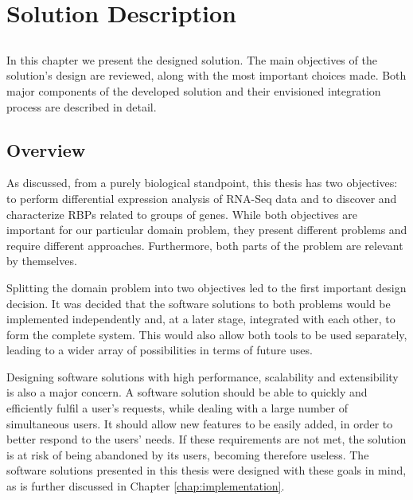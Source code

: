 \chapter{Solution Description} \label{chap:description}

\section*{}

In this chapter we present the designed solution. The main objectives of the
solution's design are reviewed, along with the most important choices made. Both
major components of the developed solution and their envisioned integration
process are described in detail.

\section{Overview}


As discussed, from a purely biological standpoint, this thesis has two
objectives: to perform differential expression analysis of RNA-Seq data and to
discover and characterize RBPs related to groups of genes. While both objectives
are important for our particular domain problem, they present different problems
and require different approaches. Furthermore, both parts of the problem are
relevant by themselves.

Splitting the domain problem into two objectives led to the first important
design decision. It was decided that the software solutions to both problems
would be implemented independently and, at a later stage, integrated with each
other, to form the complete system. This would also allow both tools to be used
separately, leading to a wider array of possibilities in terms of future uses.

Designing software solutions with high performance, scalability and
extensibility is also a major concern. A software solution should be able to
quickly and efficiently fulfil a user's requests, while dealing with a large
number of simultaneous users. It should allow new features to be easily added,
in order to better respond to the users' needs. If these requirements are not
met, the solution is at risk of being abandoned by its users, becoming therefore
useless. The software solutions presented in this thesis were designed with
these goals in mind, as is further discussed in Chapter
\ref{chap:implementation}.


